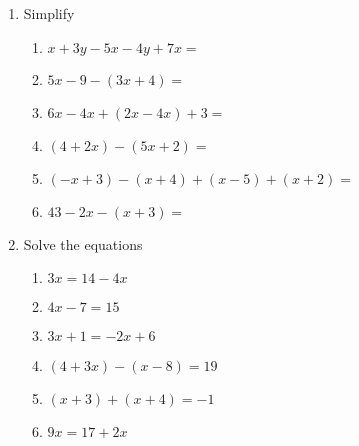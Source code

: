 \documentclass[12pt,letterpaper]{article}
\begin{document}
\begin{enumerate}
        \item Simplify
        \begin{enumerate}
            \item $x+3y-5x-4y+7x=$
            \item $5x-9-(3x+4)=$
            \item $6x-4x+(2x-4x)+3=$
            \item $(4+2x)-(5x+2)=$
            \item $(-x+3)-(x+4)+(x-5)+(x+2)=$
            \item $43-2x-(x+3)=$
        \end{enumerate}
        \item Solve the equations
        \begin{enumerate}
            \item $3x=14-4x$
            \item $4x-7=15$
            \item $3x+1=-2x+6$
            \item $(4+3x)-(x-8)=19$
            \item $(x+3)+(x+4)=-1$
            \item $9x=17+2x$
        \end{enumerate}
\end{enumerate}
\end{document}
